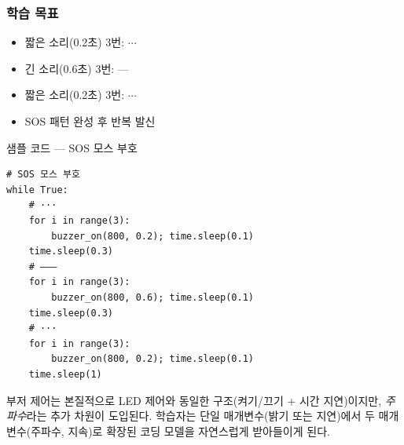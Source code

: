 \begin{storybox}
\end{storybox}

\subsubsection*{학습 목표}
\begin{itemize}[leftmargin=1.4em]
  \item 짧은 소리(0.2초) 3번: $\cdots$
  \item 긴 소리(0.6초) 3번: ---
  \item 짧은 소리(0.2초) 3번: $\cdots$
  \item SOS 패턴 완성 후 반복 발신
\end{itemize}

\begin{labbox}{샘플 코드 --- SOS 모스 부호}
\begin{verbatim}
# SOS 모스 부호
while True:
    # ···
    for i in range(3):
        buzzer_on(800, 0.2); time.sleep(0.1)
    time.sleep(0.3)
    # ———
    for i in range(3):
        buzzer_on(800, 0.6); time.sleep(0.1)
    time.sleep(0.3)
    # ···
    for i in range(3):
        buzzer_on(800, 0.2); time.sleep(0.1)
    time.sleep(1)
\end{verbatim}
\end{labbox}

\begin{keypoint}
부저 제어는 본질적으로 LED 제어와 동일한 구조(켜기/끄기 + 시간 지연)이지만,
\emph{주파수}라는 추가 차원이 도입된다. 학습자는 단일 매개변수(밝기 또는
지연)에서 두 매개변수(주파수, 지속)로 확장된 코딩 모델을 자연스럽게
받아들이게 된다.
\end{keypoint}
